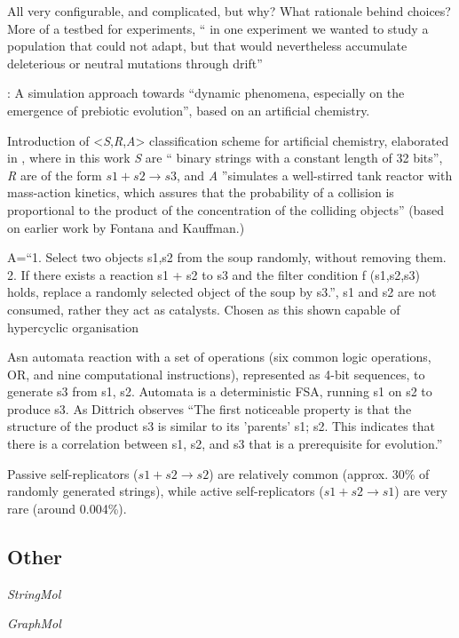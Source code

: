 \begin{NOTES}
All very configurable, and complicated, but why? What rationale behind choices? More of a testbed for experiments, \eg `` in one experiment we wanted to study a population that could not adapt, but that would nevertheless accumulate deleterious or neutral mutations through drift''

\cite{Dittrich1998}:
A simulation approach towards ``dynamic phenomena, especially on the emergence of prebiotic evolution'', based on an artificial chemistry.

Introduction of \textless{}\emph{S},\emph{R},\emph{A}\textgreater{} classification scheme for artificial chemistry, elaborated in \parencite{Dittrich:2001zr}, where in this work \emph{S} are `` binary strings with a constant length of 32 bits'', \emph{R} are of the form $s1+s2 \rightarrow s3$, and \emph{A} ''simulates a well-stirred tank reactor with mass-action kinetics, which assures that the probability of a collision is proportional to the product of the concentration of the colliding objects'' (based on earlier work by Fontana and Kauffman.)

A=``1. Select two objects s1,s2 from the soup randomly, without removing them. 2. If there exists a reaction s1 + s2 to s3 and the filter condition f (s1,s2,s3) holds, replace a randomly selected object of the soup by s3.'', s1 and s2 are not consumed, rather they act as catalysts. Chosen as this shown capable of hypercyclic organisation

Asn automata reaction with a set of operations (six common logic operations, \eg OR, and nine computational instructions), represented as 4-bit sequences, to generate s3 from s1, s2. Automata is a deterministic FSA, running s1 on s2 to produce s3. As Dittrich observes ``The first noticeable property is that the structure of the product s3 is similar to its 'parents' s1; s2. This indicates that there is a correlation between s1, s2, and s3 that is a prerequisite for evolution.''

Passive self-replicators ($s1 + s2 \rightarrow s2$) are relatively common (approx. 30\% of randomly generated strings), while active self-replicators ($s1 + s2 \rightarrow s1$) are very rare (around 0.004\%).

\subsection{Other}
\emph{StringMol} \parencite{Hickinbotham2011}


\emph{GraphMol} \parencite{Nellis2012, Nellis2014} 


\end{NOTES}
